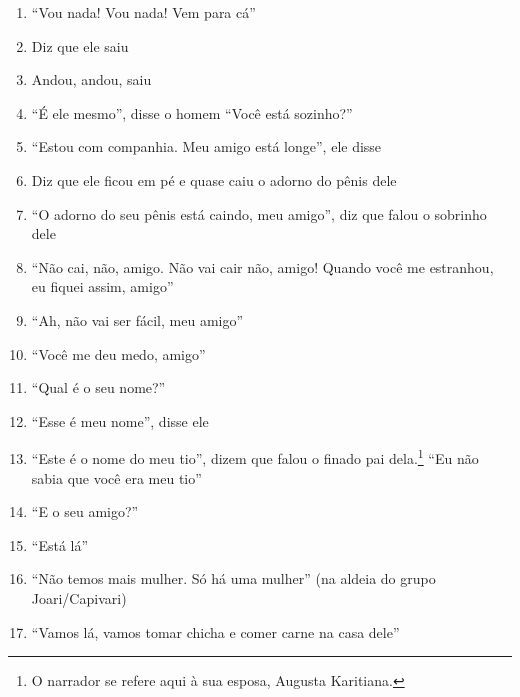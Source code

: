 \begin{enumerate}
 \item ``Vou nada! Vou nada! Vem para cá''

 \begin{center}\end{center}

 \item Diz que ele saiu

 \item Andou, andou, saiu

 \item ``É ele mesmo'', disse o homem ``Você está sozinho?''

 \item ``Estou com companhia. Meu amigo está longe'', ele disse

 \item Diz que ele ficou em pé e quase caiu o adorno do pênis dele

 \item ``O adorno do seu pênis está caindo, meu amigo'', diz que falou o
 sobrinho dele

 \item ``Não cai, não, amigo. Não vai cair não, amigo! Quando você me
 estranhou, eu fiquei assim, amigo''

 \item ``Ah, não vai ser fácil, meu amigo''

 \item ``Você me deu medo, amigo''

 \item ``Qual é o seu nome?''

 \item ``Esse é meu nome'', disse ele

 \item ``Este é o nome do meu tio'', dizem que falou o finado pai
 dela.\footnote{O narrador se refere aqui à sua esposa, Augusta Karitiana.}
 ``Eu não sabia que você era meu tio''

 \begin{center}\end{center}

 \item ``E o seu amigo?''

 \item ``Está lá''

 \item ``Não temos mais mulher. Só há uma mulher'' (na aldeia do grupo
 Joari/Capivari)

 \item ``Vamos lá, vamos tomar chicha e comer carne na casa dele''


\end{enumerate}
